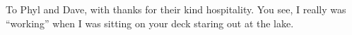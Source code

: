 
%
%
%

\thispagestyle{empty}
\vspace*{3.5cm}
\begin{flushright}

{\large To Phyl and Dave, with thanks for their kind hospitality.  You
  see, I really was ``working'' when I was sitting on your deck
  staring out at the lake.}

\end{flushright}



